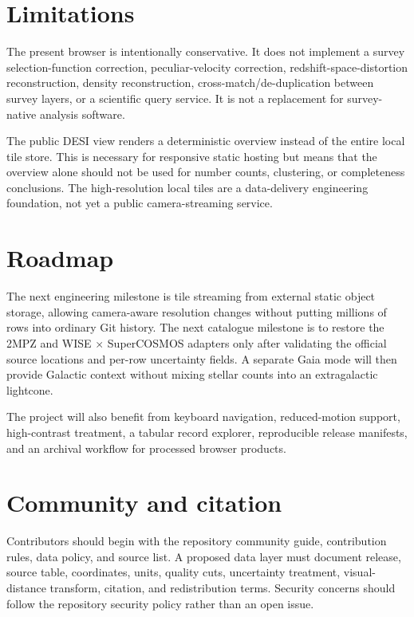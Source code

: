 \documentclass[11pt,a4paper]{article}
\begin{document}
\section{Limitations}

The present browser is intentionally conservative. It does not implement a survey selection-function correction, peculiar-velocity correction, redshift-space-distortion reconstruction, density reconstruction, cross-match/de-duplication between survey layers, or a scientific query service. It is not a replacement for survey-native analysis software.

The public DESI view renders a deterministic overview instead of the entire local tile store. This is necessary for responsive static hosting but means that the overview alone should not be used for number counts, clustering, or completeness conclusions. The high-resolution local tiles are a data-delivery engineering foundation, not yet a public camera-streaming service.

\section{Roadmap}

The next engineering milestone is tile streaming from external static object storage, allowing camera-aware resolution changes without putting millions of rows into ordinary Git history. The next catalogue milestone is to restore the 2MPZ and WISE $\times$ SuperCOSMOS adapters only after validating the official source locations and per-row uncertainty fields. A separate Gaia mode will then provide Galactic context without mixing stellar counts into an extragalactic lightcone.

The project will also benefit from keyboard navigation, reduced-motion support, high-contrast treatment, a tabular record explorer, reproducible release manifests, and an archival workflow for processed browser products.

\section{Community and citation}

Contributors should begin with the repository community guide, contribution rules, data policy, and source list. A proposed data layer must document release, source table, coordinates, units, quality cuts, uncertainty treatment, visual-distance transform, citation, and redistribution terms. Security concerns should follow the repository security policy rather than an open issue.
\end{document}

